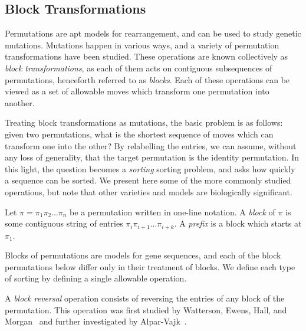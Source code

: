   \subsection{Block Transformations}
  
    Permutations are apt models for rearrangement, and can be used to study
    genetic mutations. Mutations happen in various ways, and a variety of
    permutation transformations have been studied. These operations are known
    collectively as \emph{block transformations}, as each of them acts on
    contiguous subsequences of permutations, henceforth referred to as
    \emph{blocks}. Each of these operations can be viewed as a set of allowable
    moves which transform one permutation into another. 
    
    Treating block transformations as mutations, the basic problem is as
    follows: given two permutations, what is the shortest sequence of moves
    which can transform one into the other? By relabelling the entries, we can
    assume, without any loss of generality, that the target permutation is the
    identity permutation. In this light, the question becomes a \emph{sorting}
    sorting problem, and asks how quickly a sequence can be sorted.  We present
    here some of the more commonly studied operations, but note that other
    varieties and models are biologically significant.  

    \begin{definition} \label{polyclass:def:block}
      Let $\pi = \pi_1 \pi_2 \dots \pi_n$ be a permutation written in one-line
      notation. A \emph{block} of $\pi$ is some contiguous string of entries 
      $\pi_{i} \pi_{i + 1} \dots \pi_{i+k}$. 
      A \emph{prefix} is a block which starts at $\pi_1$. 
    \end{definition}

    Blocks of permutations are models for gene sequences, and each of the block
    permutations below differ only in their treatment of blocks. We define each
    type of sorting by defining a single allowable operation. 

    \begin{definition}\label{polyclass:def:blockrev}
      A \emph{block reversal} operation consists of reversing the entries of
      any block of the permutation. This operation was first studied by
      Watterson, Ewens, Hall, and Morgan~\cite{Watterson1982} and further
      investigated by Alpar-Vajk~\cite{Alpar2009}.
    \end{definition}
    
